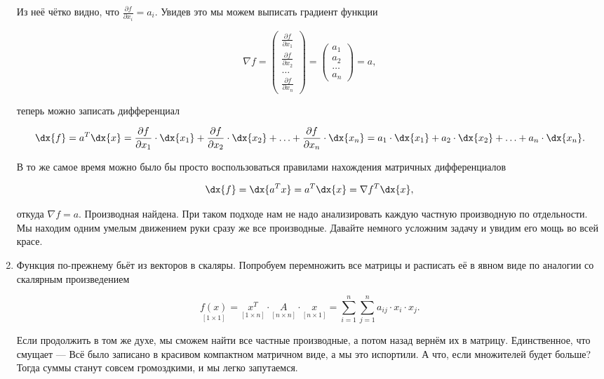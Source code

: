 \begin{sol}
\begin{enumerate}
Из неё чётко видно, что $\frac{\partial f}{\partial x_i} = a_i$. Увидев это мы можем выписать градиент функции 

\[
\nabla f = \begin{pmatrix} \frac{\partial f}{\partial x_1} \\ \frac{\partial f}{\partial x_2} \\ \ldots  \\ \frac{\partial f}{\partial x_n} \end{pmatrix} = \begin{pmatrix} a_1 \\ a_2 \\ \ldots  \\ a_n \end{pmatrix} = a,
\]

теперь можно записать дифференциал

\[
\dx{f} = a^T \dx{x} = \frac{\partial f}{\partial x_1} \cdot \dx{x_1} + \frac{\partial f}{\partial x_2} \cdot \dx{x_2} + \ldots +\frac{\partial f}{\partial x_n} \cdot \dx{x_n} = a_1 \cdot \dx{x_1} + a_2 \cdot \dx{x_2} + \ldots + a_n \cdot \dx{x_n}.
\]

В то же самое время можно было бы просто воспользоваться правилами нахождения матричных дифференциалов

\[
\dx{f} =  \dx{a^T x} = a^T \dx{x} = \nabla f^T \dx{x},
\]

откуда $ \nabla f = a$. Производная найдена. При таком подходе нам не надо анализировать каждую частную производную по отдельности. Мы находим одним умелым движением руки сразу же все производные. Давайте немного усложним задачу и увидим его мощь во всей красе.

\item Функция по-прежнему бьёт из векторов в скаляры. Попробуем перемножить все матрицы и расписать её в явном виде по аналогии со скалярным произведением 


\begin{equation*}
\underset{[1 \times 1]}{f(x)} = \underset{[1 \times n]}{x^T} \cdot \underset{[n \times n]}{A} \cdot \underset{[n \times 1]}{x} = \sum_{i = 1}^n \sum_{j=1}^n a_{ij} \cdot x_i \cdot x_j.
\end{equation*} 

Если продолжить в том же духе, мы сможем найти все частные производные, а потом назад вернём их в матрицу. Единственное, что смущает ---  Всё было записано в красивом компактном матричном виде, а мы это испортили. А что, если множителей будет больше? Тогда суммы станут совсем громоздкими, и мы легко запутаемся. 


\end{enumerate}
\end{sol}
